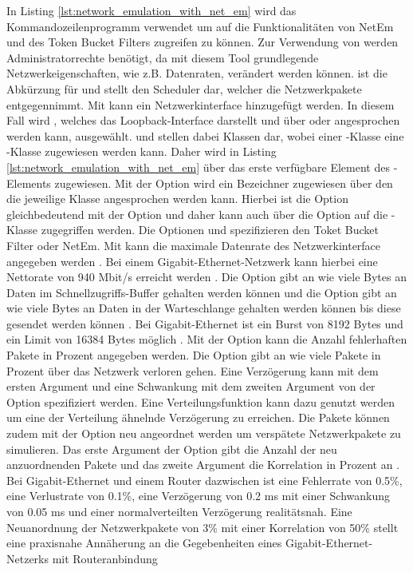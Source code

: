 In Listing \ref{lst:network_emulation_with_net_em} wird das Kommandozeilenprogramm  verwendet um auf die Funktionalitäten von NetEm und des Token Bucket Filters zugreifen zu können. Zur Verwendung von  werden Administratorrechte benötigt, da mit diesem Tool grundlegende Netzwerkeigenschaften, wie z.B. Datenraten, verändert werden können.  ist die Abkürzung für  und stellt den Scheduler dar, welcher die Netzwerkpakete entgegennimmt. Mit  kann ein Netzwerkinterface hinzugefügt werden. In diesem Fall wird , welches das Loopback-Interface darstellt und über  oder  angesprochen werden kann, ausgewählt.  und  stellen dabei Klassen dar, wobei einer -Klasse eine -Klasse zugewiesen werden kann. Daher wird in Listing \ref{lst:network_emulation_with_net_em} über  das erste verfügbare Element des -Elements zugewiesen. Mit der Option  wird ein Bezeichner zugewiesen über den die jeweilige Klasse angesprochen werden kann. Hierbei ist die Option  gleichbedeutend mit der Option  und daher kann auch über die Option  auf die -Klasse zugegriffen werden. Die Optionen  und  spezifizieren den Toket Bucket Filter oder NetEm. Mit  kann die maximale Datenrate des Netzwerkinterface angegeben werden \cite{tc_net_em_nodate}. Bei einem Gigabit-Ethernet-Netzwerk kann hierbei eine Nettorate von 940 Mbit/s erreicht werden \cite{datendurchsatz_2020}. Die Option  gibt an wie viele Bytes an Daten im Schnellzugriffs-Buffer gehalten werden können und die Option  gibt an wie viele Bytes an Daten in der Warteschlange gehalten werden können bis diese gesendet werden können \cite{tc_net_em_nodate}. Bei Gigabit-Ethernet ist ein Burst von 8192 Bytes und ein Limit von 16384 Bytes möglich \cite{dembowski_lokale_2007}. Mit der Option  kann die Anzahl fehlerhaften Pakete in Prozent angegeben werden. Die Option  gibt an wie viele Pakete in Prozent über das Netzwerk verloren gehen. Eine Verzögerung kann mit dem ersten Argument und eine Schwankung mit dem zweiten Argument von der Option  spezifiziert werden. Eine Verteilungsfunktion kann dazu genutzt werden um eine der Verteilung ähnelnde Verzögerung zu erreichen. Die Pakete können zudem mit der Option  neu angeordnet werden um verspätete Netzwerkpakete zu simulieren. Das erste Argument der Option  gibt die Anzahl der neu anzuordnenden Pakete und das zweite Argument die Korrelation in Prozent an \cite{tbf_token_bucket_filter_nodate}. Bei Gigabit-Ethernet und einem Router dazwischen ist eine Fehlerrate von \num{0,5}\%, eine Verlustrate von \num{0,1}\%, eine Verzögerung von \num{0,2} ms mit einer Schwankung von \num{0,05} ms und einer normalverteilten Verzögerung realitätsnah. Eine Neuanordnung der Netzwerkpakete von 3\% mit einer Korrelation von 50\% stellt eine praxisnahe Annäherung an die Gegebenheiten eines Gigabit-Ethernet-Netzerks mit Routeranbindung 